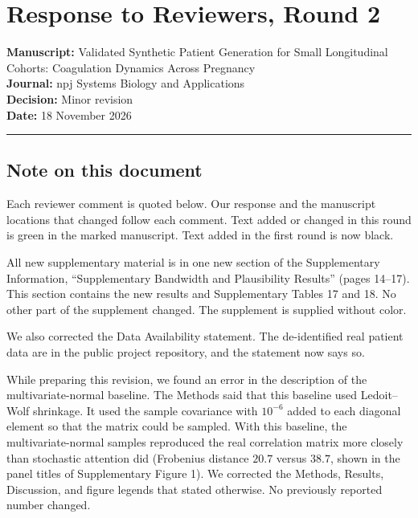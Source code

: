 \documentclass[
  11pt,
  letterpaper,
]{article}
\author{}
\date{}
\begin{document}
\section{Response to Reviewers, Round
2}\label{response-to-reviewers-round-2}

\textbf{Manuscript:} Validated Synthetic Patient Generation for Small
Longitudinal Cohorts: Coagulation Dynamics Across Pregnancy\\
\textbf{Journal:} npj Systems Biology and Applications\\
\textbf{Decision:} Minor revision\\
\textbf{Date:} 18 November 2026

\begin{center}\rule{0.5\linewidth}{0.5pt}\end{center}

\subsection{Note on this document}\label{note-on-this-document}

Each reviewer comment is quoted below. Our response and the manuscript
locations that changed follow each comment. Text added or changed in
this round is green in the marked manuscript. Text added in the first
round is now black.

All new supplementary material is in one new section of the
Supplementary Information, ``Supplementary Bandwidth and Plausibility
Results'' (pages 14--17). This section contains the new results and
Supplementary Tables 17 and 18. No other part of the supplement changed.
The supplement is supplied without color.

We also corrected the Data Availability statement. The de-identified
real patient data are in the public project repository, and the
statement now says so.

While preparing this revision, we found an error in the description of
the multivariate-normal baseline. The Methods said that this baseline
used Ledoit--Wolf shrinkage. It used the sample covariance with
\(10^{-6}\) added to each diagonal element so that the matrix could be
sampled. With this baseline, the multivariate-normal samples reproduced
the real correlation matrix more closely than stochastic attention did
(Frobenius distance \(20.7\) versus \(38.7\), shown in the panel titles
of Supplementary Figure 1). We corrected the Methods, Results,
Discussion, and figure legends that stated otherwise. No previously
reported number changed.
\end{document}
